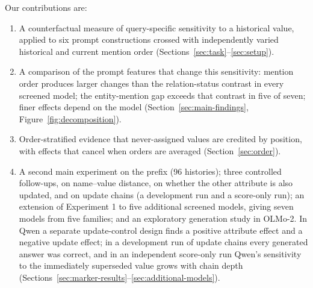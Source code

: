 Our contributions are:
\begin{enumerate}
\item A counterfactual measure of query-specific sensitivity to a historical value, applied to six prompt constructions crossed with independently varied historical and current mention order (Sections~\ref{sec:task}--\ref{sec:setup}).
\item A comparison of the prompt features that change this sensitivity: mention order produces larger changes than the relation-status contrast in every screened model; the entity-mention gap exceeds that contrast in five of seven; finer effects depend on the model (Section~\ref{sec:main-findings}, Figure~\ref{fig:decomposition}).
\item Order-stratified evidence that never-assigned values are credited by position, with effects that cancel when orders are averaged (Section~\ref{sec:order}).
\item A second main experiment on the prefix  (96 histories); three controlled follow-ups, on name--value distance, on whether the other attribute is also updated, and on update chains (a development run and a score-only run); an extension of Experiment 1 to five additional screened models, giving seven models from five families; and an exploratory generation study in OLMo-2. In Qwen a separate update-control design finds a positive attribute effect and a negative update effect; in a development run of update chains every generated answer was correct, and in an independent score-only run Qwen's sensitivity to the immediately superseded value grows with chain depth (Sections~\ref{sec:marker-results}--\ref{sec:additional-models}).
\end{enumerate}
